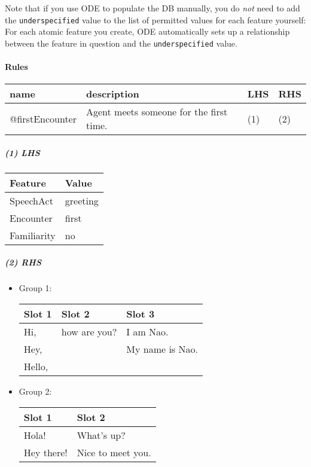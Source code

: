 \documentclass[11pt]{article}
\begin{document}
Note that if you use ODE to populate the DB manually, you do
\emph{not} need to add the \texttt{underspecified} value to the list of
permitted values for each feature yourself: For each atomic
feature you create, ODE automatically sets up a relationship
between the feature in question and the \texttt{underspecified} value.

\paragraph{Rules}
\label{sec-3-4-1-4}
\begin{center}
\begin{tabular}{llll}
\hline
\textbf{name} & \textbf{description} & \textbf{LHS} & \textbf{RHS}\\
\hline
@firstEncounter & Agent meets someone for the first time. & (1) & (2)\\
\hline
\end{tabular}
\end{center}

\subparagraph{(1) LHS}
\label{sec-3-4-1-4-1}
\begin{center}
\begin{tabular}{ll}
\hline
\textbf{Feature} & \textbf{Value}\\
\hline
SpeechAct & greeting\\
Encounter & first\\
Familiarity & no\\
\hline
\end{tabular}
\end{center}

\subparagraph{(2) RHS}
\label{sec-3-4-1-4-2}
\begin{itemize}
\item Group 1:

\begin{center}
\begin{tabular}{lll}
\hline
\textbf{Slot 1} & \textbf{Slot 2} & \textbf{Slot 3}\\
\hline
Hi, & how are you? & I am Nao.\\
Hey, &  & My name is Nao.\\
Hello, &  & \\
\hline
\end{tabular}
\end{center}

\item Group 2:

\begin{center}
\begin{tabular}{ll}
\hline
\textbf{Slot 1} & \textbf{Slot 2}\\
\hline
Hola! & What's up?\\
Hey there! & Nice to meet you.\\
\hline
\end{tabular}
\end{center}
\end{itemize}
\end{document}
